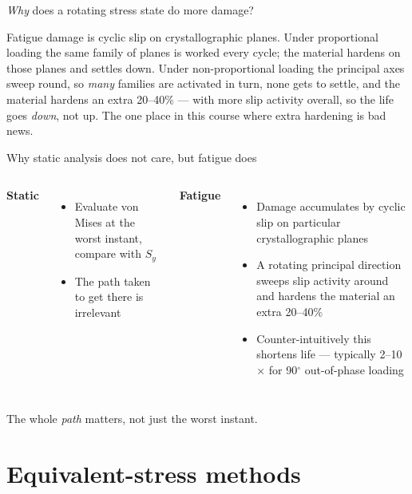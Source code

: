 \documentclass[aspectratio=169,10pt]{beamer}
\begin{document}
\begin{frame}{\emph{Why} does a rotating stress state do more damage?}
\centering
\scalebox{0.82}{}

\raggedright\footnotesize
Fatigue damage is cyclic slip on crystallographic planes. Under \alert{proportional} loading the same family of planes is worked every cycle; the material hardens on those planes and settles down. Under \alert{non-proportional} loading the principal axes sweep round, so \emph{many} families are activated in turn, none gets to settle, and the material hardens an extra 20--40\% --- with more slip activity overall, so the life goes \emph{down}, not up. \alert{The one place in this course where extra hardening is bad news.}
\end{frame}

\begin{frame}{Why static analysis does not care, but fatigue does}
\begin{columns}[T]
\textbf{Static}
\begin{itemize}\footnotesize
  \item Evaluate von Mises at the worst instant, compare with $S_y$
  \item The path taken to get there is \alert{irrelevant}
\end{itemize}
\textbf{Fatigue}
\begin{itemize}\footnotesize
  \item Damage accumulates by cyclic slip on particular crystallographic planes
  \item A rotating principal direction sweeps slip activity around and hardens the material an extra 20--40\%
  \item Counter-intuitively this \alert{shortens} life --- typically 2--10$\times$ for 90$^\circ$ out-of-phase loading
\end{itemize}
\end{columns}
\vspace{6pt}
\begin{alertblock}{}
The whole \emph{path} matters, not just the worst instant.
\end{alertblock}
\end{frame}

\section{Equivalent-stress methods}
\end{document}
